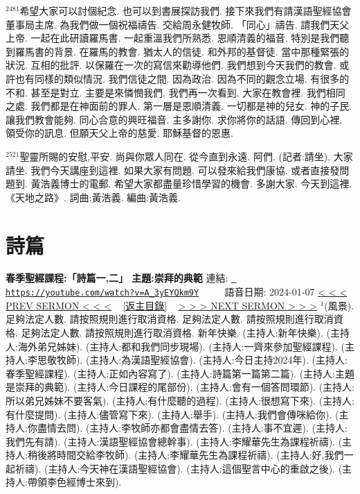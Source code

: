 \documentclass{book}
\begin{document}
$^{2481}$希望大家可以討個紀念.
也可以到書展探訪我們.
接下來我們有請漢語聖經協會董事局主席.
為我們做一個祝福禱告.
交給周永健牧師.
「同心」禱告.
請我們天父上帝.
一起在此研讀羅馬書.
一起重溫我們所熟悉.
恩順清義的福音.
特別是我們聽到羅馬書的背景.
在羅馬的教會.
猶太人的信徒.
和外邦的基督徒.
當中那種緊張的狀況.
互相的批評.
以保羅在一次的寫信來勸導他們.
我們想到今天我們的教會.
或許也有同樣的類似情況.
我們信徒之間.
因為政治.
因為不同的觀念立場.
有很多的不和.
甚至是對立.
主要是來憐憫我們.
我們再一次看到.
大家在教會裡.
我們相同之處.
我們都是在神面前的罪人.
第一層是恩順清義.
一切都是神的兒女.
神的子民.
讓我們教會能夠.
同心合意的興旺福音.
主多謝你.
求你將你的話語.
傳回到心裡.
領受你的訊息.
但願天父上帝的慈愛.
耶穌基督的恩惠.

$^{2521}$聖靈所賜的安慰,平安.
尚與你眾人同在.
從今直到永遠.
阿們.
(記者:請坐).
大家請坐.
我們今天講座到這裡.
如果大家有問題.
可以發來給我們康協.
或者直接發問題到.
黃浩義博士的電郵.
希望大家都盡量珍惜學習的機會.
多謝大家.
今天到這裡.
《天地之路》.
詞曲:黃浩義.
編曲:黃浩義.
\newpage



\section{詩篇}
\label{sec:A_3yEYQkm9Y}
\textbf{春季聖經課程:「詩篇一,二」 主題:崇拜的典範}
\newline
\newline
連結: \href{https://youtube.com/watch?v=A_3yEYQkm9Y}{\texttt{ https://youtube.com/watch?v=A\_3yEYQkm9Y}} ~~~~ 語音日期: 2024-01-07 
\newline
\newline
\hyperref[sec:VhiGoXEG1RY]{\small{< < < PREV SERMON < < <}}
~
\hyperref[sec:index]{\small{[返主目錄]}}
~
\hyperref[sec:h6V3lBcFI1I]{\small{> > > NEXT SERMON > > >}}
\newline
\newline
$^{1}$(風景).
足夠法定人數.
請按照規則進行取消資格.
足夠法定人數.
請按照規則進行取消資格.
足夠法定人數.
請按照規則進行取消資格.
新年快樂.
(主持人:新年快樂).
(主持人:海外弟兄姊妹).
(主持人:都和我們同步現場).
(主持人:一齊來參加聖經課程).
(主持人:李思敬牧師).
(主持人:為漢語聖經協會).
(主持人:今日主持2024年).
(主持人:春季聖經課程).
(主持人:正如內容寫了).
(主持人:詩篇第一篇第二篇).
(主持人:主題是崇拜的典範).
(主持人:今日課程的尾部份).
(主持人:會有一個答問環節).
(主持人:所以弟兄姊妹不要客氣).
(主持人:有什麼聽的過程).
(主持人:很想寫下來).
(主持人:有什麼提問).
(主持人:儘管寫下來).
(主持人:舉手).
(主持人:我們會傳咪給你).
(主持人:你盡情去問).
(主持人:李牧師亦都會盡情去答).
(主持人:事不宜遲).
(主持人:我們先有請).
(主持人:漢語聖經協會總幹事).
(主持人:李耀華先生為課程祈禱).
(主持人:稍後將時間交給李牧師).
(主持人:李耀華先生為課程祈禱).
(主持人:好,我們一起祈禱).
(主持人:今天神在漢語聖經協會).
(主持人:這個聖言中心的重啟之後).
(主持人:帶領李色經博士來到).
\end{document}
